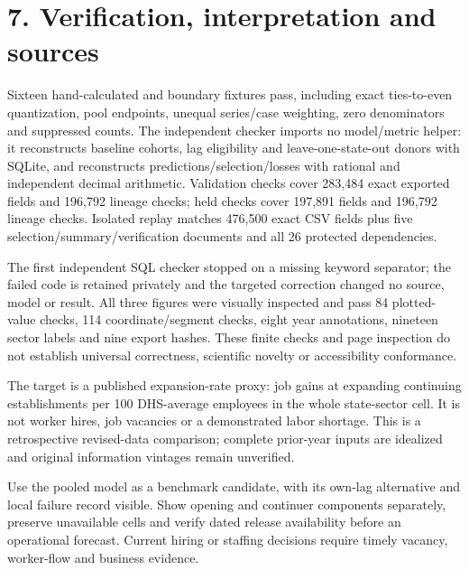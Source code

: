 \documentclass[11pt]{article}
\begin{document}
\newpage\section*{7. Verification, interpretation and sources}
Sixteen hand-calculated and boundary fixtures pass, including exact ties-to-even quantization, pool endpoints, unequal series/case weighting, zero denominators and suppressed counts. The independent checker imports no model/metric helper: it reconstructs baseline cohorts, lag eligibility and leave-one-state-out donors with SQLite, and reconstructs predictions/selection/losses with rational and independent decimal arithmetic. Validation checks cover 283,484 exact exported fields and 196,792 lineage checks; held checks cover 197,891 fields and 196,792 lineage checks. Isolated replay matches 476,500 exact CSV fields plus five selection/summary/verification documents and all 26 protected dependencies.

The first independent SQL checker stopped on a missing keyword separator; the failed code is retained privately and the targeted correction changed no source, model or result. All three figures were visually inspected and pass 84 plotted-value checks, 114 coordinate/segment checks, eight year annotations, nineteen sector labels and nine export hashes. These finite checks and page inspection do not establish universal correctness, scientific novelty or accessibility conformance.

The target is a published expansion-rate proxy: job gains at expanding continuing establishments per 100 DHS-average employees in the whole state-sector cell. It is not worker hires, job vacancies or a demonstrated labor shortage. This is a retrospective revised-data comparison; complete prior-year inputs are idealized and original information vintages remain unverified.

Use the pooled model as a benchmark candidate, with its own-lag alternative and local failure record visible. Show opening and continuer components separately, preserve unavailable cells and verify dated release availability before an operational forecast. Current hiring or staffing decisions require timely vacancy, worker-flow and business evidence.
\end{document}
